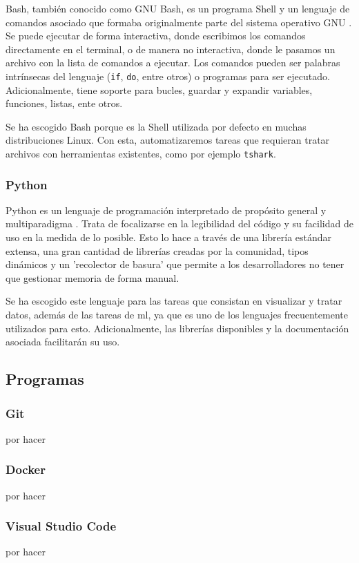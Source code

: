 \color{blue} %

Bash, también conocido como GNU Bash, es un programa Shell y un lenguaje de comandos asociado que formaba originalmente parte del sistema operativo GNU \cite{gnubashweb} \cite{gnubashmanual}. Se puede ejecutar de forma interactiva, donde escribimos los comandos directamente en el terminal, o de manera no interactiva, donde le pasamos un archivo con la lista de comandos a ejecutar. Los comandos pueden ser palabras intrínsecas del lenguaje (\texttt{if}, \texttt{do}, entre otros) o programas para ser ejecutado. Adicionalmente, tiene soporte para bucles, guardar y expandir variables, funciones, listas, ente otros.

Se ha escogido Bash porque es la Shell utilizada por defecto en muchas distribuciones Linux. Con esta, automatizaremos tareas que requieran tratar archivos con herramientas existentes, como por ejemplo \texttt{tshark}.

\subsubsection{Python}

Python es un lenguaje de programación interpretado de propósito general y multiparadigma \cite{aboutpython} \cite{davepython}. Trata de focalizarse en la legibilidad del código y su facilidad de uso en la medida de lo posible. Esto lo hace a través de una librería estándar extensa, una gran cantidad de librerías creadas por la comunidad, tipos dinámicos y un 'recolector de basura' que permite a los desarrolladores no tener que gestionar memoria de forma manual.

Se ha escogido este lenguaje para las tareas que consistan en visualizar y tratar datos, además de las tareas de \gls{ml}, ya que es uno de los lenguajes frecuentemente utilizados para esto. Adicionalmente, las librerías disponibles y la documentación asociada facilitarán su uso.

\subsection{Programas}

\subsubsection{Git}

por hacer

\subsubsection{Docker}

por hacer

\subsubsection{Visual Studio Code}

por hacer

